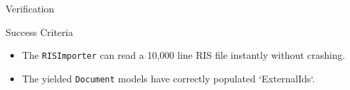 \documentclass[aspectratio=169]{beamer}
\begin{document}
\begin{frame}{Verification}
  \begin{alertblock}{Success Criteria}
    \begin{itemize}
        \item The \texttt{RISImporter} can read a 10,000 line RIS file instantly without crashing.
        \item The yielded \texttt{Document} models have correctly populated `ExternalIds`.
    \end{itemize}
  \end{alertblock}
\end{frame}
\end{document}
